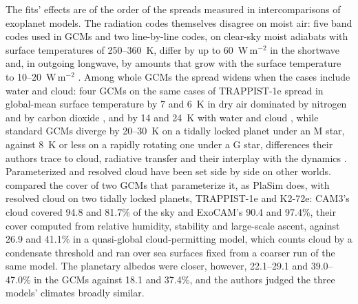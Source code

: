The fits' effects are of the order of the spreads measured in intercomparisons of exoplanet models. The radiation
codes themselves disagree on moist air: five band codes used in GCMs and two line-by-line codes, on clear-sky
moist adiabats with surface temperatures of 250--360~K, differ by up to 60~W\,m$^{-2}$ in the shortwave and, in
outgoing longwave, by amounts that grow with the surface temperature to 10--20~W\,m$^{-2}$
\autocite{yang2016differences}. Among whole GCMs the spread widens when the cases include water and cloud: four GCMs on the same
cases of TRAPPIST-1e spread in global-mean surface temperature by 7 and 6~K in dry air dominated by nitrogen and by
carbon dioxide \autocite{turbet2022thai}, and by 14 and 24~K with water and cloud \autocite{sergeev2022thai},
while standard GCMs diverge by 20--30~K on a tidally locked planet under an M star, against 8~K or less on a
rapidly rotating one under a G star, differences their authors trace to cloud, radiative transfer and their
interplay with the dynamics \autocite{yang2019simulations}. Parameterized and resolved cloud have been set side by
side on other worlds. \textcite{yang2023cloud} compared the cover of two GCMs that parameterize it, as PlaSim does,
with resolved cloud on two tidally locked planets, TRAPPIST-1e and K2-72e: CAM3's cloud covered 94.8 and 81.7\% of the sky and ExoCAM's 90.4 and 97.4\%, their cover computed from relative humidity, stability and large-scale ascent, against
26.9 and 41.1\% in a quasi-global cloud-permitting model, which counts cloud by a condensate threshold and ran over
sea surfaces fixed from a coarser run of the same model. The planetary albedos were closer, however, 22.1--29.1 and
39.0--47.0\% in the GCMs against 18.1 and 37.4\%, and the authors judged the three models' climates broadly
similar.

